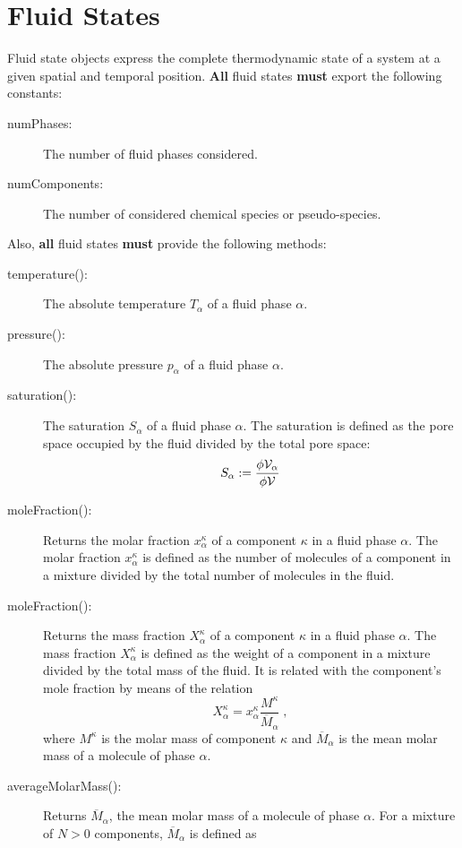 \section{Fluid States}

Fluid state objects express the complete thermodynamic state of a
system at a given spatial and temporal position. {\bf All} fluid
states {\bf must} export the following constants:
\begin{description}
\item[numPhases:] The number of fluid phases considered.
\item[numComponents:] The number of considered chemical
  species or pseudo-species.
\end{description}

Also, {\bf all} fluid states {\bf must} provide the following methods:
\begin{description}
\item[temperature():] The absolute temperature $T_\alpha$ of
  a fluid phase $\alpha$.
\item[pressure():] The absolute pressure $p_\alpha$ of a
  fluid phase $\alpha$.
\item[saturation():] The saturation $S_\alpha$ of a fluid 
  phase $\alpha$. The saturation is defined as the pore space occupied by the
  fluid divided by the total pore space:
  \[
  S_\alpha := \frac{\phi \mathcal{V}_\alpha}{\phi \mathcal{V}}
  \]
\item[moleFraction():] Returns the molar fraction
  $x^\kappa_\alpha$ of a component $\kappa$ in a fluid phase
  $\alpha$. The molar fraction $x^\kappa_\alpha$ is defined as the number
  of molecules of a component in a mixture divided by the total number
  of molecules in the fluid.
\item[moleFraction():] Returns the mass fraction
  $X^\kappa_\alpha$ of a component $\kappa$ in a fluid phase
  $\alpha$. The mass fraction $X^\kappa_\alpha$ is defined as the
  weight of a component in a mixture divided by the total mass of the
  fluid. It is related with the component's mole fraction by means of
  the relation
  \[
  X^\kappa_\alpha = x^\kappa_\alpha \frac{M^\kappa}{\overline M_\alpha}\;,
  \]
  where $M^\kappa$ is the molar mass of component $\kappa$ and
  $\overline M_\alpha$ is the mean molar mass of a molecule of phase
  $\alpha$.
\item[averageMolarMass():] Returns $\overline M_\alpha$, the
  mean molar mass of a molecule of phase $\alpha$. For a mixture of $N
  > 0$ components, $\overline M_\alpha$ is defined as

\end{description}
